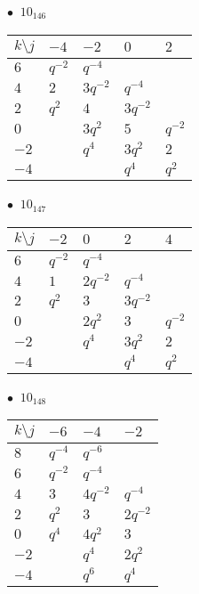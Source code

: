 %
\begin{minipage}{\linewidth}
$\bullet\ $ $10_{146}$ \vspace{0.5em} \\
\begin{tabular}{l|llll}
$k \setminus j$ & $-4$ & $-2$ & $0$ & $2$ \\
\hline
$6$ & $q^{-2}$ & $q^{-4}$ &  &  \\
$4$ & $2$ & $3q^{-2}$ & $q^{-4}$ &  \\
$2$ & $q^{2}$ & $4$ & $3q^{-2}$ &  \\
$0$ &  & $3q^{2}$ & $5$ & $q^{-2}$ \\
$-2$ &  & $q^{4}$ & $3q^{2}$ & $2$ \\
$-4$ &  &  & $q^{4}$ & $q^{2}$ \\
\end{tabular}
\vspace{2em}
\end{minipage}
%
\begin{minipage}{\linewidth}
$\bullet\ $ $10_{147}$ \vspace{0.5em} \\
\begin{tabular}{l|llll}
$k \setminus j$ & $-2$ & $0$ & $2$ & $4$ \\
\hline
$6$ & $q^{-2}$ & $q^{-4}$ &  &  \\
$4$ & $1$ & $2q^{-2}$ & $q^{-4}$ &  \\
$2$ & $q^{2}$ & $3$ & $3q^{-2}$ &  \\
$0$ &  & $2q^{2}$ & $3$ & $q^{-2}$ \\
$-2$ &  & $q^{4}$ & $3q^{2}$ & $2$ \\
$-4$ &  &  & $q^{4}$ & $q^{2}$ \\
\end{tabular}
\vspace{2em}
\end{minipage}
%
\begin{minipage}{\linewidth}
$\bullet\ $ $10_{148}$ \vspace{0.5em} \\
\begin{tabular}{l|lll}
$k \setminus j$ & $-6$ & $-4$ & $-2$ \\
\hline
$8$ & $q^{-4}$ & $q^{-6}$ &  \\
$6$ & $q^{-2}$ & $q^{-4}$ &  \\
$4$ & $3$ & $4q^{-2}$ & $q^{-4}$ \\
$2$ & $q^{2}$ & $3$ & $2q^{-2}$ \\
$0$ & $q^{4}$ & $4q^{2}$ & $3$ \\
$-2$ &  & $q^{4}$ & $2q^{2}$ \\
$-4$ &  & $q^{6}$ & $q^{4}$ \\
\end{tabular}
\vspace{2em}
\end{minipage}
